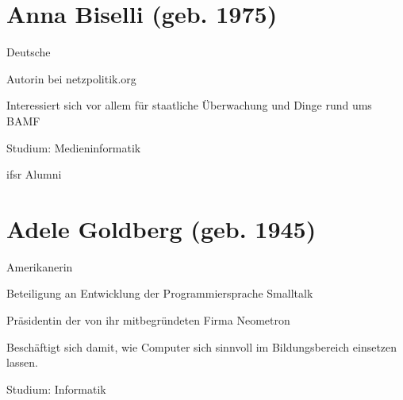 \documentclass[a4paper,12pt]{report}
\begin{document}
\section*{Anna Biselli (geb. 1975)}
\begin{itemize*}
    \item Deutsche
    \item Autorin bei netzpolitik.org
    \item Interessiert sich vor allem für staatliche Überwachung und Dinge rund ums BAMF
    \item Studium: Medieninformatik
    \item ifsr Alumni
\end{itemize*}

\section*{Adele Goldberg (geb. 1945)}
\begin{itemize*}
    \item Amerikanerin
    \item Beteiligung an Entwicklung der Programmiersprache Smalltalk
    \item Präsidentin der von ihr mitbegründeten Firma Neometron
    \item Beschäftigt sich damit, wie Computer sich sinnvoll im Bildungsbereich einsetzen lassen.
    \item Studium: Informatik
\end{itemize*}



\end{document}
